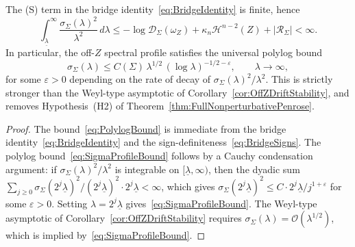 \begin{corollary}\label{cor:PolylogBoundFromBridge}
The (S) term in the bridge identity~\eqref{eq:BridgeIdentity} is finite, hence
\begin{equation}\label{eq:PolylogBound}
    \int_{\underline\lambda}^\infty \frac{\sigma_\Sigma(\lambda)^2}{\lambda^2}\,d\lambda
    \le
    -\log\mathscr D_\Sigma(\omega_Z)+\kappa_n\mathcal H^{n-2}(Z)+|\mathcal R_\Sigma|
    <\infty.
\end{equation}
In particular, the off-$Z$ spectral profile satisfies the universal polylog bound
\begin{equation}\label{eq:SigmaProfileBound}
    \sigma_\Sigma(\lambda)
    \le
    C(\Sigma)\,\lambda^{1/2}\,(\log\lambda)^{-1/2-\varepsilon},
    \qquad \lambda\to\infty,
\end{equation}
for some $\varepsilon>0$ depending on the rate of decay of $\sigma_\Sigma(\lambda)^2/\lambda^2$. This is strictly stronger than the Weyl-type asymptotic of Corollary~\ref{cor:OffZDriftStability}, and removes Hypothesis~\textup{(H2)} of Theorem~\ref{thm:FullNonperturbativePenrose}.
\end{corollary}

\begin{proof}
The bound~\eqref{eq:PolylogBound} is immediate from the bridge identity~\eqref{eq:BridgeIdentity} and the sign-definiteness~\eqref{eq:BridgeSigns}. The polylog bound~\eqref{eq:SigmaProfileBound} follows by a Cauchy condensation argument: if $\sigma_\Sigma(\lambda)^2/\lambda^2$ is integrable on $[\underline\lambda,\infty)$, then the dyadic sum $\sum_{j\ge0}\sigma_\Sigma(2^j\underline\lambda)^2/(2^j\underline\lambda)^2\cdot2^j\underline\lambda<\infty$, which gives $\sigma_\Sigma(2^j\underline\lambda)^2\le C\cdot2^j\underline\lambda/j^{1+\varepsilon}$ for some $\varepsilon>0$. Setting $\lambda=2^j\underline\lambda$ gives~\eqref{eq:SigmaProfileBound}. The Weyl-type asymptotic of Corollary~\ref{cor:OffZDriftStability} requires $\sigma_\Sigma(\lambda)=\mathcal O(\lambda^{1/2})$, which is implied by~\eqref{eq:SigmaProfileBound}.
\end{proof}

